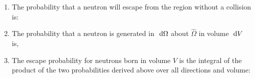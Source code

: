 \documentclass{school-22.211-notes}
\begin{document}
\begin{enumerate}
\item The probability that a neutron will escape from the region without a collision is: 

\item The probability that a neutron is generated in $\mbox{ }\mathrm{d} \Omega$ about $\hat{\Omega}$ in volume $\mbox{ }\mathrm{d} V$ is, 

\item The escape probability for neutrons born in volume $V$ is the integral of the product of the two probabilities derived above over all directions and volume: 


\end{enumerate}
\end{document}
